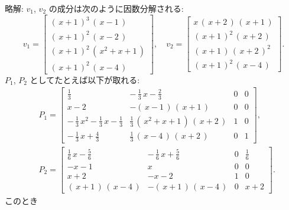 \documentclass[12pt,twoside]{jarticle}
\newcommand\commentout[1]{#1}
\newcommand\commentout[1]{}
\begin{document}
\commentout{
\noindent
略解: $v_1$, $v_2$ の成分は次のように因数分解される:
\begin{equation*}
  v_1 =
  \left[ 
    \begin{array}{c}
      (\,{x} + 1\,)^{3}\,(\,{x} - 1\,) \\
      (\,{x} + 1\,)^{2}\,(\,{x} - 2\,) \\
      (\,{x} + 1\,)^{2}\,(\,{x}^{2} + {x} + 1\,) \\
      (\,{x} + 1\,)^{2}\,(\,{x} - 4\,)
    \end{array}
  \right],
  \quad
  v_2 =
  \left[ 
    \begin{array}{c}
      {x}\,(\,{x} + 2\,)\,(\,{x} + 1\,) \\
      (\,{x} + 1\,)^{2}\,(\,{x} + 2\,) \\
      (\,{x} + 1\,)\,(\,{x} + 2\,)^{2} \\
      (\,{x} + 1\,)^{2}\,(\,{x} - 4\,)
    \end{array}
  \right].
\end{equation*}
$P_1$, $P_2$ としてたとえば以下が取れる:
\begin{align*}
  &
  P_1 = 
  \left[ 
    \begin{array}{ccrr}
      {\frac {1}{3}} &  - \,{\frac {1}{3}}
      \,{x} - {\frac {2}{3}} & 0 & 0 \\ [2ex]
      {x} - 2 &  - (\,{x} - 1\,)\,(\,{x} + 1\,) & 0 & 0 \\
      - \,{\frac {1}{3}}\,{x}^{2} - {
        \frac {1}{3}}\,{x} - {\frac {1}{3}} & 
      {\frac {1}{3}}\,(\,{x}^{2} + {x} + 1\,)\,(\,{x} + 2
      \,) & 1 & 0 \\ [2ex]
      - \,{\frac {1}{3}}\,{x} + {\frac {4
          }{3}} & {\frac {1}{3}}\,(\,{x} - 4\,)\,(\,{x} + 2\,
      ) & 0 & 1
    \end{array}
  \right],
  \\ &
  P_2 =
  \left[ 
    \begin{array}{ccrc}
      {\frac {1}{6}}\,{x} - {\frac {5}{6}}
      &  - \,{\frac {1}{6}}\,{x} + {
        \frac {5}{6}} & 0 & {\frac {1}{6}} \\ [2ex]
      - {x} - 1 & {x} & 0 & 0 \\
      {x} + 2 &  - {x} - 2 & 1 & 0 \\
      (\,{x} + 1\,)\,(\,{x} - 4\,) &  - (\,{x} + 1\,)\,(\,{x} - 4\,) & 
      0 & {x} + 2
    \end{array}
  \right].
\end{align*}
このとき
\begin{equation*}

\end{equation*}}
\end{document}
